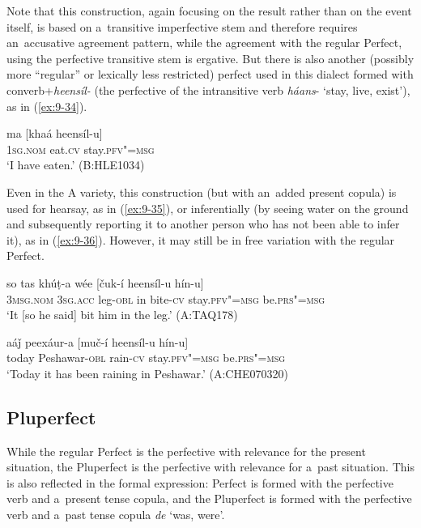 Note that this construction, again focusing on the result rather than on the event itself, is based on a~transitive imperfective stem and therefore requires an~accusative agreement pattern, while the agreement with the regular Perfect, using the perfective transitive stem is ergative. But there is also another (possibly more ``regular'' or lexically less restricted) perfect used in this dialect formed with converb+\textit{heensíl-} (the perfective of the intransitive verb \textit{háans}- `stay, live, exist'), as in (\ref{ex:9-34}).

\begin{exe}
\ex
\label{ex:9-34}
\gll ma [khaá heensíl-u]  \\
\textsc{1sg.nom} eat.\textsc{cv} stay.\textsc{pfv"=msg} \\
\glt `I have eaten.' (B:HLE1034)
\end{exe}

Even in the A variety, this construction (but with an~added present copula) is used for hearsay, as in (\ref{ex:9-35}), or inferentially (by seeing water on the ground and subsequently reporting it to another person who has not been able to infer it), as in (\ref{ex:9-36}). However, it may still be in free variation with the regular Perfect.

\begin{exe}
\ex
\label{ex:9-35}
\gll so tas khúṭ-a wée [čuk-í heensíl-u hín-u] \\
\textsc{3msg.nom} \textsc{3sg.acc} leg-\textsc{obl} in bite-\textsc{cv} stay.\textsc{pfv"=msg} be.\textsc{prs"=msg} \\
\glt `It [so he said] bit him in the leg.' (A:TAQ178)

\ex
\label{ex:9-36}
\gll aáǰ peexáur-a [muč-í heensíl-u hín-u]  \\
today Peshawar-\textsc{obl} rain-\textsc{cv} stay.\textsc{pfv"=msg} be.\textsc{prs"=msg} \\
\glt `Today it has been raining in Peshawar.' (A:CHE070320)
\end{exe}

\subsection{Pluperfect}
\label{subsec:9-1-8}

While the regular Perfect is the perfective with relevance for the present situation, the Pluperfect is the perfective with relevance for a~past situation. This is also reflected in the formal expression: Perfect is formed with the perfective verb and a~present tense copula, and the Pluperfect is formed with the perfective verb and a~past tense copula \textit{de} `was, were'. 


